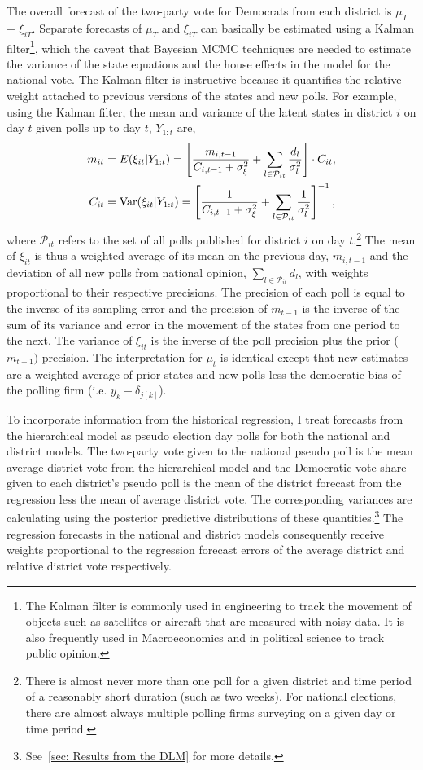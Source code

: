 \documentclass[12pt,final,fleqn]{article}
\theoremstyle{plain}
\newcommand\var{{\rm Var}}
\begin{document}
The overall forecast of the two-party vote for Democrats from each district is $\mu_T$ + $\xi_{iT}$. Separate forecasts of $\mu_T$ and $\xi_{iT}$ can basically be estimated using a Kalman filter\footnote{The Kalman filter is commonly used in engineering to track the movement of objects such as satellites or aircraft that are measured with noisy data. It is also frequently used in Macroeconomics and in political science to track public opinion.}, which the caveat that Bayesian MCMC techniques are needed to estimate the variance of the state equations and the house effects in the model for the national vote. The Kalman filter is instructive because it quantifies the relative weight attached to previous versions of the states and new polls. For example, using the Kalman filter, the mean and variance of the latent states in district $i$ on day $t$ given polls up to day $t$, $Y_{1:t}$ are,
\begin{align}
m_{it} &= E(\xi_{it}|Y_{1:t})= \left[\frac{m_{i,t-1}}{C_{i,t-1} + \sigma_\xi^2} + \sum_{l \in \mathcal{P}_{it}} \frac{d_{l}}{\sigma^2_l}\right]\cdot C_{it},\\
C_{it} &= \var(\xi_{it}|Y_{1:t})= \left[\frac{1}{C_{i,t-1} + \sigma_\xi^2}+ \sum_{l \in \mathcal{P}_{it}}\frac{1}{\sigma^2_{l}}\right]^{-1},
\end{align}
where $\mathcal{P}_{it}$ refers to the set of all polls published for district $i$ on day $t$.\footnote{There is almost never more than one poll for a given district and time period of a reasonably short duration (such as two weeks). For national elections, there are almost always multiple polling firms surveying on a given day or time period.}
The mean of $\xi_{it}$ is thus a weighted average of its mean on the previous day, $m_{i,t-1}$ and the deviation of all new polls from national opinion, $\sum_{l \in \mathcal{P}_{it}} d_{l}$, with weights proportional to their respective precisions. The precision of each poll is equal to the inverse of its sampling error and the precision of $m_{t-1}$ is the inverse of the sum of its variance and error in the movement of the states from one period to the next. The variance of $\xi_{it}$ is the inverse of the poll precision plus the prior ($m_{t-1})$ precision. The interpretation for $\mu_t$ is identical except that new estimates are a weighted average of prior states and new polls less the democratic bias of the polling firm (i.e. $y_{k} - \delta_{j[k]}$).

To incorporate information from the historical regression, I treat forecasts from the hierarchical model as pseudo election day polls for both the national and district models. The two-party vote given to the national pseudo poll is the mean average district vote from the hierarchical model and the Democratic vote share given to each district's pseudo poll is the mean of the district forecast from the regression less the mean of average district vote. The corresponding variances are calculating using the posterior predictive distributions of these quantities.\footnote{See~\autoref{sec: Results from the DLM} for more details.} The regression forecasts in the national and district models consequently receive weights proportional to the regression forecast errors of the average district and relative district vote respectively. 
\end{document}
